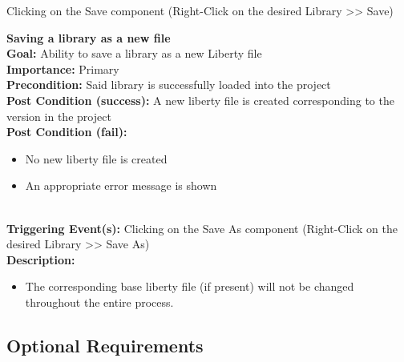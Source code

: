 \documentclass[10pt,a4paper]{report}
\newcommand{\precondition}[1]{
    \textbf{Precondition: } #1 \leavevmode \\
}
\newcommand{\FRDescription}[8]{
    \textbf{#1} \leavevmode \\
    \textbf{Goal: } #2 \leavevmode \\
    \textbf{Importance: } #3 \leavevmode \\
    \precondition{#4}
    \textbf{Post Condition (success): } #5 \leavevmode \\
    \textbf{Post Condition (fail): } #6 \leavevmode \\
    \textbf{Triggering Event(s): } #7 \leavevmode \\
    \textbf{Description: } \leavevmode \\ 
    #8}
\begin{document}
\begin{FR}
    {Clicking on the Save component (Right-Click on the desired Library  >> Save)}
    \item \FRDescription{Saving a library as a new file}
    {Ability to save a library as a new Liberty file}
    {Primary}
    {Said library is successfully loaded into the project}
    {A new liberty file is created corresponding to the version in the project}
    {\begin{itemize}
        \item No new liberty file is created
        \item An appropriate error message is shown
    \end{itemize}}
    {Clicking on the Save As component (Right-Click on the desired Library  >> Save As)}
    {\begin{itemize}
        \item The corresponding base liberty file (if present) will not be changed throughout the entire process.
    \end{itemize}}
\end{FR}

\subsection{Optional Requirements}
\end{document}
